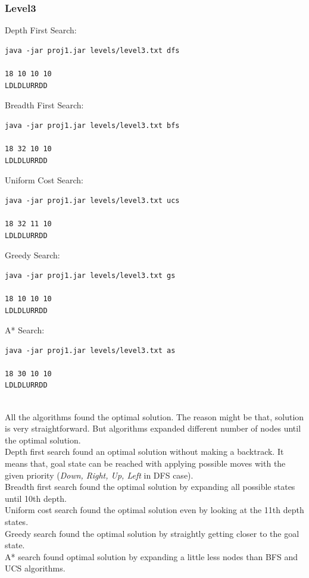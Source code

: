 \documentclass[12pt]{article}
\begin{document}
\subsubsection*{Level3}
Depth First Search:
\begin{lstlisting}[style=terminalstyle]
java -jar proj1.jar levels/level3.txt dfs

18 10 10 10
LDLDLURRDD
\end{lstlisting}
Breadth First Search:
\begin{lstlisting}[style=terminalstyle]
java -jar proj1.jar levels/level3.txt bfs

18 32 10 10
LDLDLURRDD
\end{lstlisting}
Uniform Cost Search:
\begin{lstlisting}[style=terminalstyle]
java -jar proj1.jar levels/level3.txt ucs

18 32 11 10
LDLDLURRDD
\end{lstlisting}
Greedy Search:
\begin{lstlisting}[style=terminalstyle]
java -jar proj1.jar levels/level3.txt gs

18 10 10 10
LDLDLURRDD
\end{lstlisting}
A* Search:
\begin{lstlisting}[style=terminalstyle]
java -jar proj1.jar levels/level3.txt as

18 30 10 10
LDLDLURRDD
\end{lstlisting}
\\
All the algorithms found the optimal solution. The reason might be that, solution is very straightforward. But algorithms expanded different number of nodes until the optimal solution.\\
Depth first search found an optimal solution without making a backtrack. It means that, goal state can be reached with applying possible moves with the given priority (\textit{Down, Right, Up, Left} in DFS case).\\
Breadth first search found the optimal solution by expanding all possible states until 10th depth.\\
Uniform cost search found the optimal solution even by looking at the 11th depth states.\\
Greedy search found the optimal solution by straightly getting closer to the goal state.\\
A* search found optimal solution by expanding a little less nodes than BFS and UCS algorithms.\\
\end{document}
